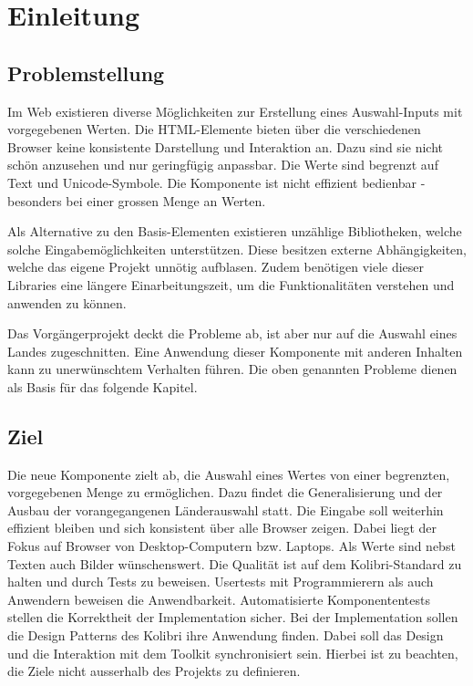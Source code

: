 \chapter{Einleitung}
\label{chap:intro}


\section{Problemstellung}
\label{sec:problem}

Im Web existieren diverse Möglichkeiten zur Erstellung eines Auswahl-Inputs mit vorgegebenen Werten.
Die HTML-Elemente bieten über die verschiedenen Browser keine konsistente Darstellung und Interaktion an.
Dazu sind sie nicht schön anzusehen und nur geringfügig anpassbar. 
Die Werte sind begrenzt auf Text und Unicode-Symbole.
Die Komponente ist nicht effizient bedienbar - besonders bei einer grossen Menge an Werten.

Als Alternative zu den Basis-Elementen existieren unzählige Bibliotheken, welche solche Eingabemöglichkeiten unterstützen.
Diese besitzen externe Abhängigkeiten, welche das eigene Projekt unnötig aufblasen.
Zudem benötigen viele dieser Libraries eine längere Einarbeitungszeit, um die Funktionalitäten verstehen und anwenden zu können.

Das Vorgängerprojekt deckt die Probleme ab, ist aber nur auf die Auswahl eines Landes zugeschnitten.
Eine Anwendung dieser Komponente mit anderen Inhalten kann zu unerwünschtem Verhalten führen.
Die oben genannten Probleme dienen als Basis für das folgende Kapitel.


\section{Ziel}
\label{sec:goal}

Die neue Komponente zielt ab, die Auswahl eines Wertes von einer begrenzten, vorgegebenen Menge zu ermöglichen.
Dazu findet die Generalisierung und der Ausbau der vorangegangenen Länderauswahl statt.
Die Eingabe soll weiterhin effizient bleiben und sich konsistent über alle Browser zeigen.
Dabei liegt der Fokus auf Browser von Desktop-Computern bzw. Laptops.
Als Werte sind nebst Texten auch Bilder wünschenswert.
Die Qualität ist auf dem Kolibri-Standard zu halten und durch Tests zu beweisen.
Usertests mit Programmierern als auch Anwendern beweisen die Anwendbarkeit.
Automatisierte Komponententests stellen die Korrektheit der Implementation sicher.
Bei der Implementation sollen die Design Patterns des Kolibri ihre Anwendung finden.
Dabei soll das Design und die Interaktion mit dem Toolkit synchronisiert sein.
Hierbei ist zu beachten, die Ziele nicht ausserhalb des Projekts zu definieren.


